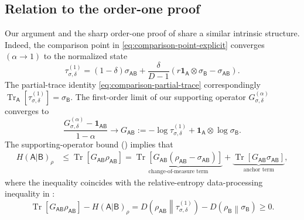 \documentclass[11pt,reqno]{amsart}
\theoremstyle{definition}
\DeclareMathOperator{\Tr}{Tr}
\newcommand{\I}{\mathbf 1}
\newcommand{\A}{\mathsf{A}}
\newcommand{\B}{\mathsf{B}}
\begin{document}
\subsection{Relation to the order-one proof}
Our argument and the sharp order-one proof of \cite{BertaEtAl2026} share a similar intrinsic structure.
Indeed, the comparison point in
\cref{eq:comparison-point-explicit} converges $(\alpha\to1)$ to the normalized state
\begin{equation} \label{eq:order-one-tau}
    \tau_{\sigma,\delta}^{(1)}
    =
    (1-\delta)\sigma_{\A\B}
    +
    \frac{\delta}{D-1}
    \left(
        r\I_{\A}\otimes\sigma_{\B}
        -
        \sigma_{\A\B}
    \right).
\end{equation}
The partial-trace identity
\cref{eq:comparison-partial-trace} correspondingly $\Tr_{\A}[\tau_{\sigma,\delta}^{(1)}]
    =
    \sigma_{\B}$.
The first-order limit of our supporting operator
\(G_{\sigma,\delta}^{(\alpha)}\) converges to
\begin{equation}
\label{eq:order-one-score-limit}
    \frac{
        G_{\sigma,\delta}^{(\alpha)}
        -
        \I_{\A\B}
    }{1-\alpha}
    \rightarrow
    G_{\A\B}
    :=
    -\log\tau_{\sigma,\delta}^{(1)}
    +
    \I_{\A}\otimes\log\sigma_{\B}.
\end{equation}
The supporting-operator bound () implies that
\begin{align}
    H(\A|\B)_\rho
    &\leq%
    \Tr\!\left[
        G_{\A\B} \rho_{\A\B}
    \right]
    =
    \underbrace{\Tr\!\left[
        G_{\A\B} (\rho_{\A\B}-\sigma_{\A\B})
    \right]}_{\text{change-of-measure term}}
    +
    \underbrace{\Tr\!\left[
        G_{\A\B} \sigma_{\A\B}
    \right]}_{\text{anchor term}},
    \label{eq:order-one-score-decomposition}
\end{align}
where the inequality coincides with the relative-entropy data-processing inequality in \cite{BertaEtAl2026}:
\begin{equation}
    \Tr\!\left[
         G_{\A\B} \rho_{\A\B}
    \right]
    -
    H(\A|\B)_\rho
    =
    D\!\left(
        \rho_{\A\B}\middle\|\tau_{\sigma,\delta}^{(1)}
    \right)
    -
    D\!\left(
        \rho_{\B}\middle\|\sigma_{\B}
    \right)
    \geq0.
\end{equation}
\end{document}
